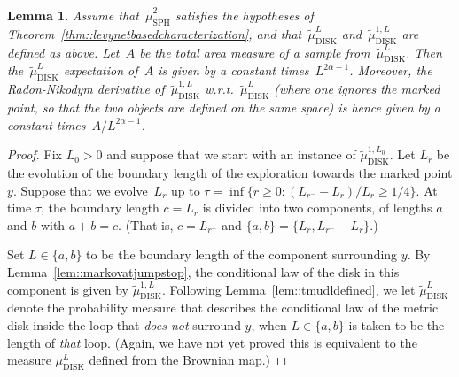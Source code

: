 \documentclass[10pt]{amsart}
\theoremstyle{plain}
\numberwithin{theorem}{section}
\newtheorem{lemma}[theorem]{Lemma}
\theoremstyle{definition}
\newcommand{\mudl}{\mu_{\mathrm{DISK}}^L}
\newcommand{\tmustwo}{\wt{\mu}_{\mathrm{SPH}}^2}
\newcommand{\tmudonel}{\wt{\mu}_{ \mathrm{DISK}}^{1, L}}
\newcommand{\tmudl}{\wt{\mu}_{\mathrm{DISK}}^L}
\def\tmudonelset#1{\wt{\mu}_{ \mathrm{DISK}}^{1, #1}}
\let\wt\widetilde
\begin{document}
\begin{lemma}
\label{lem::tmudlareaexpectation}
Assume that~$\tmustwo$ satisfies the hypotheses of Theorem~\ref{thm::levynetbasedcharacterization}, and that~$\tmudl$ and~$\tmudonel$ are defined as above. Let~$A$ be the total area measure of a sample from~$\tmudl$. Then the~$\tmudl$ expectation of~$A$ is given by a constant times~$L^{2\alpha - 1}$. Moreover, the Radon-Nikodym derivative of~$\tmudonel$ w.r.t.\ $\tmudl$ (where one ignores the marked point, so that the two objects are defined on the same space) is hence given by a constant times~$A/L^{2\alpha - 1}$.
\end{lemma}
\begin{proof}
Fix $L_0 > 0$ and suppose that we start with an instance of $\tmudonelset{L_0}$. Let $L_r$ be the evolution of the boundary length of the exploration towards the marked point $y$. Suppose that we evolve~$L_r$ up to $\tau = \inf\{r \geq 0 : (L_{r^-} - L_r)/L_r \geq 1/4\}$. At time $\tau$, the boundary length $c = L_r$ is divided into two components, of lengths $a$ and $b$ with $a+b=c$. (That is, $c = L_{r^-}$ and $\{a,b\} = \{L_r,L_{r^-} - L_r\}$.)

Set $L \in \{a,b\}$ to be the boundary length of the component surrounding $y$. By Lemma~\ref{lem::markovatjumpstop}, the conditional law of the disk in this component is given by $\tmudonel$. Following Lemma~\ref{lem::tmudldefined}, we let $\tmudl$ denote the probability measure that describes the conditional law of the metric disk inside the loop that \emph{does not} surround $y$, when $L \in \{a, b \}$ is taken to be the length of \emph{that} loop. (Again, we have not yet proved this is equivalent to the measure $\mudl$ defined from the Brownian map.)


\end{proof}
\end{document}
